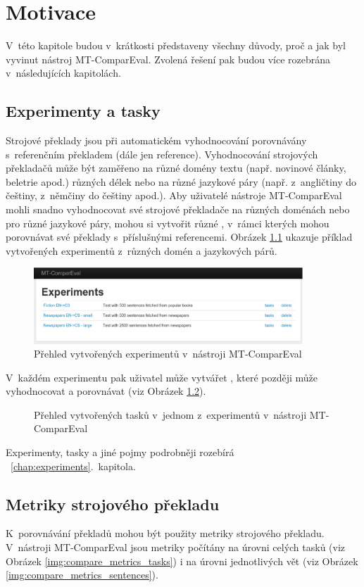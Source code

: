 \chapter{Motivace}
V~této kapitole budou v~krátkosti představeny všechny důvody,
  proč a jak byl vyvinut nástroj MT-ComparEval.
Zvolená řešení pak budou více rozebrána v~následujících kapitolách.

\section{Experimenty a tasky}
Strojové překlady jsou při automatickém vyhodnocování porovnávány s~referenčním překladem
  (dále jen reference).
Vyhodnocování strojových překladačů může být zaměřeno na různé domény textu (např. novinové články, beletrie apod.) různých délek
  nebo na různé jazykové páry (např. z~angličtiny do češtiny, z~němčiny do češtiny apod.).
Aby uživatelé nástroje MT-ComparEval mohli snadno vyhodnocovat své strojové překladače na různých doménách nebo pro různé jazykové páry,
  mohou si vytvořit různé \textbf{},
  v~rámci kterých mohou porovnávat své překlady s~příslušnými referencemi.
Obrázek \ref{img:experiments} ukazuje příklad vytvořených experimentů z~různých domén a jazykových párů.
\begin{figure}
	\center
	\includegraphics[width=0.9\textwidth]{img/experiments.eps}

	\caption{Přehled vytvořených experimentů v~nástroji MT-ComparEval}
	\label{img:experiments}
\end{figure}

V~každém experimentu pak uživatel může vytvářet \textbf{},
  které později může vyhodnocovat a porovnávat (viz Obrázek \ref{img:tasks}).
\begin{figure}
	\caption{Přehled vytvořených tasků v~jednom z~experimentů v~nástroji MT-ComparEval}
	\label{img:tasks}
\end{figure}

Experimenty, tasky a jiné pojmy podrobněji rozebírá ~\ref{chap:experiments}.~kapitola.


\section{Metriky strojového překladu}
K~porovnávání překladů mohou být použity metriky strojového překladu.
V~nástroji MT-ComparEval jsou metriky počítány na úrovni celých tasků 
  (viz Obrázek \ref{img:compare_metrics_tasks})
  i na úrovni jednotlivých vět
  (viz Obrázek \ref{img:compare_metrics_sentences}).

